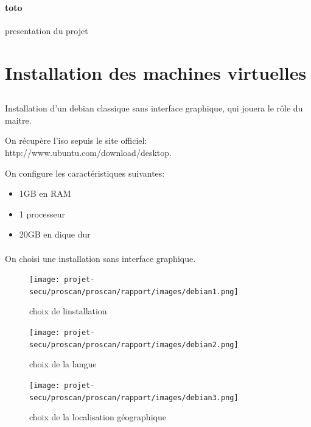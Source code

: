 \documentclass[11pt,a4paper,titlepage, oneside]{article}
\begin{document}
	\paragraph{toto}
		presentation du projet
		
		
\newpage
\thispagestyle{empty}
\tableofcontents
\listoffigures  %

\newpage
{} \setcounter{page}{1}
\section{{\color{red}Installation des machines virtuelles}}
\subsection{{\color{blue}{Installation du serveur Debian}}}
	\paragraph{}
		Installation d'un debian classique sans interface graphique, qui jouera le rôle du maitre.
		
		On récupère l'iso sepuis le site officiel: http://www.ubuntu.com/download/desktop.

		On configure les caractéristiques suivantes:
		\begin{itemize}
                        \item{1GB en RAM}
                        \item{1 processeur}
                        \item{20GB en dique dur}
                \end{itemize}
 		\paragraph{}
		On choisi une installation sans interface graphique.
		 \begin{figure}[h]
                        \centering
                        \texttt{[image: projet-secu/proscan/proscan/rapport/images/debian1.png]}
                        \caption{choix de linstallation}
                \end{figure}
		

	\newpage		
		\begin{figure}[h]
                        \centering
                        \texttt{[image: projet-secu/proscan/proscan/rapport/images/debian2.png]}
                        \caption{choix de la langue}
                \end{figure}
	\newpage
		\begin{figure}[h]
                        \centering
                        \texttt{[image: projet-secu/proscan/proscan/rapport/images/debian3.png]}
                        \caption{choix de la localisation géographique}
                \end{figure}
\end{document}
